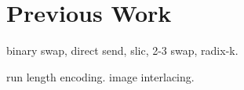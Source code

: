 \documentclass[letterpaper,twocolumn,10pt]{article}
\begin{document}
\section{Previous Work}

binary swap, direct send, slic, 2-3 swap, radix-k.

run length encoding. image interlacing.
\end{document}
